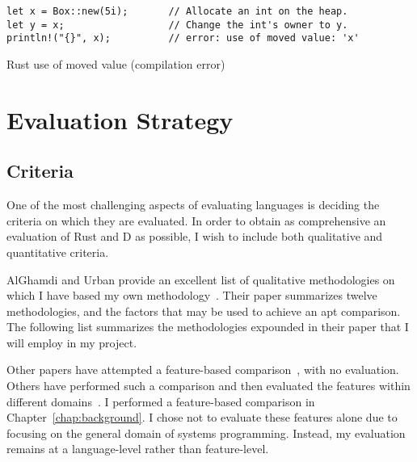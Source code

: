\documentclass[finalcopy]{srpaper}
\begin{document}
\begin{listing}[h]
\begin{verbatim}
let x = Box::new(5i);       // Allocate an int on the heap.
let y = x;                  // Change the int's owner to y.
println!("{}", x);          // error: use of moved value: 'x'
\end{verbatim}
\caption{Rust use of moved value (compilation error)}
\label{lst:rustuseaftermove}
\end{listing}

\chapter{Evaluation Strategy}

\section{Criteria}

One of the most challenging aspects of evaluating languages is deciding the
criteria on which they are evaluated. In order to obtain as comprehensive an
evaluation of Rust and D as possible, I wish to include both qualitative and
quantitative criteria.

AlGhamdi and Urban provide an excellent list of qualitative methodologies on
which I have based my own methodology~\cite{AlGhamdi:1993:CAP:162754.162876}.
Their paper summarizes twelve methodologies, and the factors that may be used
to achieve an apt comparison. The following list summarizes the methodologies
expounded in their paper that I will employ in my project.

Other papers have attempted a feature-based
comparison~\cite{comparingFunctional}, with no evaluation. Others have
performed such a comparison and then evaluated the features within different
domains~\cite{Feuer:1982:CPL:356869.356872}. I performed a feature-based
comparison in Chapter~\ref{chap:background}. I chose not to evaluate these
features alone due to focusing on the general domain of systems programming.
Instead, my evaluation remains at a language-level rather than feature-level.
\end{document}
